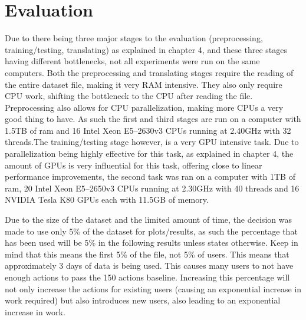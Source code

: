 \chapter{Evaluation}\label{ch:evaluation}

Due to there being three major stages to the evaluation (preprocessing, training/testing, translating) as explained in chapter 4, and these three stages having different bottlenecks, not all experiments were run on the same computers. Both the preprocessing and translating stages require the reading of the entire dataset file, making it very RAM intensive. They also only require CPU work, shifting the bottleneck to the CPU after reading the file. Preprocessing also allows for CPU parallelization, making more CPUs a very good thing to have. As such the first and third stages are run on a computer with 1.5TB of ram and 16 Intel Xeon E5--2630v3 CPUs running at 2.40GHz with 32 threads.The training/testing stage however, is a very GPU intensive task. Due to parallelization being highly effective for this task, as explained in chapter 4, the amount of GPUs is very influential for this task, offering close to linear performance improvements, the second task was ran on a computer with 1TB of ram, 20 Intel Xeon E5--2650v3 CPUs running at 2.30GHz with 40 threads and 16 NVIDIA Tesla K80 GPUs each with 11.5GB of memory. 

Due to the size of the dataset and the limited amount of time, the decision was made to use only 5\% of the dataset for plots/results, as such the percentage that has been used will be 5\% in the following results unless states otherwise. Keep in mind that this means the first 5\% of the file, not 5\% of users. This means that approximately 3 days of data is being used. This causes many users to not have enough actions to pass the 150 actions baseline. Increasing this percentage will not only increase the actions for existing users (causing an exponential increase in work required) but also introduces new users, also leading to an exponential increase in work. 

